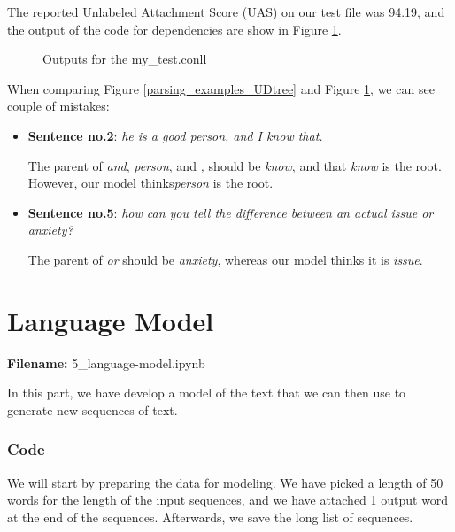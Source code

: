 \documentclass[12pt, a4paper]{article}
\begin{document}
The reported Unlabeled Attachment Score (UAS) on our test file was 94.19, and the output of the code for dependencies are show in Figure \ref{parsing_output}. 
\begin{figure}[H]
	\caption{Outputs for the my\_test.conll}
	\label{parsing_output}
\end{figure}

When comparing Figure \ref{parsing_examples_UDtree} and Figure \ref{parsing_output}, we can see couple of mistakes:
\begin{itemize}
	\item \textbf{Sentence no.2}: \emph{he is a good person, and I know that.}
	
	The parent of \emph{and}, \emph{person}, and \emph{,} should be \emph{know}, and that \emph{know} is the root. However, our model thinks\emph{person} is the root.
	
	\item \textbf{Sentence no.5}:
	 \emph{how can you tell the difference between an actual issue or anxiety?}
	 
	 The parent of \emph{or} should be \emph{anxiety}, whereas our model thinks it is \emph{issue}.
\end{itemize}
 

\newpage
\part{Language Model}
\large{\textbf{Filename:} 5\_language-model.ipynb}

In this part, we have develop a model of the text that we can then use to generate new sequences of text.

\section*{Code}
We will start by preparing the data for modeling. 
We have picked a length of 50 words for the length of the input sequences, and we have attached 1 output word at the end of the sequences. Afterwards, we save the long list of sequences.
\end{document}
